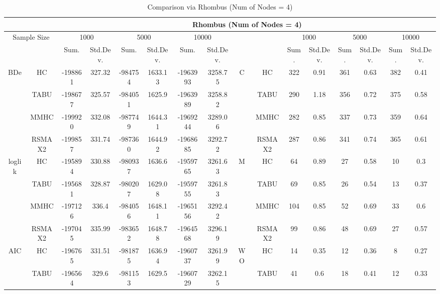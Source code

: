 \begin{table}[!hbp]
\centering	\caption{Comparison via Rhombus (Num of Nodes = 4)}	\tiny																						
{\tabcolsep=0.01in																										
\begin{tabular}{cc||cc|cc|cc||cc|cc|cc|cc}																										
\hline																										
&	&	\multicolumn{14}{c}{Rhombus	(Num	of	Nodes	=	4)}\tabularnewline																			
\hline																										
\multicolumn{2}{c||}{Sample	Size}	&	\multicolumn{2}{c|}{1000}	&	\multicolumn{2}{c|}{5000}	&	\multicolumn{2}{c||}{10000}	&	&	&	\multicolumn{2}{c|}{1000}	&	\multicolumn{2}{c|}{5000}	&	\multicolumn{2}{c}{10000}\tabularnewline											
\hline																										
&	&	Sum.	&	Std.Dev.	&	Sum.	&	Std.Dev.	&	Sum.	&	Std.Dev.	&	&	&	Sum.	&	Std.Dev.	&	Sum.	&	Std.Dev.	&	Sum.	&	Std.Dev.\tabularnewline
\hline																										
\hline																										
\multirow{4}{*}{BDe} & HC &	-198861 & 	327.32 & 	-984754 & 	1633.13 & 	-1963993 & 	3258.75 & 	\multirow{4}{*}{C} & HC &	322 & 	0.91 & 	361 & 	0.63 & 	382 & 	0.41\tabularnewline													
& TABU &	-198677 & 	325.57 & 	-984051 & 	1625.9 & 	-1963989 & 	3258.82 & 	& TABU &	290 & 	1.18 & 	356 & 	0.72 & 	375 & 	0.58\tabularnewline													
& MMHC &	-199920 & 	332.08 & 	-987749 & 	1644.31 & 	-1969244 & 	3289.06 & 	& MMHC &	282 & 	0.85 & 	337 & 	0.73 & 	359 & 	0.64\tabularnewline													
& RSMAX2 &	-199857 & 	331.74 & 	-987360 & 	1644.92 & 	-1968685 & 	3292.72 & 	& RSMAX2 &	287 & 	0.86 & 	341 & 	0.74 & 	365 & 	0.61\tabularnewline													
\hline																										
\multirow{4}{*}{loglik} & HC &	-195894 & 	330.88 & 	-980937 & 	1636.6 & 	-1959765 & 	3261.63 & 	\multirow{4}{*}{M} & HC &	64 & 	0.89 & 	27 & 	0.58 & 	10 & 	0.3\tabularnewline													
& TABU &	-195681 & 	328.87 & 	-980207 & 	1629.08 & 	-1959755 & 	3261.83 & 	& TABU &	69 & 	0.85 & 	26 & 	0.54 & 	13 & 	0.37\tabularnewline													
& MMHC &	-197126 & 	336.4 & 	-984056 & 	1648.11 & 	-1965156 & 	3292.42 & 	& MMHC &	104 & 	0.85 & 	52 & 	0.69 & 	33 & 	0.6\tabularnewline													
& RSMAX2 &	-197045 & 	335.99 & 	-983652 & 	1648.78 & 	-1964568 & 	3296.19 & 	& RSMAX2 &	99 & 	0.86 & 	48 & 	0.69 & 	27 & 	0.57\tabularnewline													
\hline																										
\multirow{4}{*}{AIC} & HC &	-196765 & 	331.51 & 	-981875 & 	1636.94 & 	-1960737 & 	3261.99 & 	\multirow{4}{*}{WO} & HC &	14 & 	0.35 & 	12 & 	0.36 & 	8 & 	0.27\tabularnewline													
& TABU &	-196564 & 	329.6 & 	-981153 & 	1629.5 & 	-1960729 & 	3262.15 & 	& TABU &	41 & 	0.6 & 	18 & 	0.41 & 	12 & 	0.33\tabularnewline													

\end{tabular}}
\end{table}
